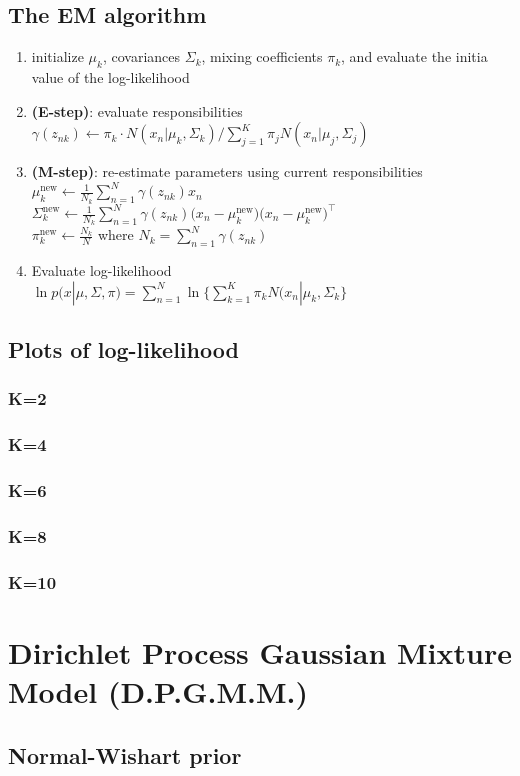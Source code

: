 \documentclass{article}
\begin{document}
\subsection{The EM algorithm}
\begin{enumerate}
	\item initialize $\mu_k$, covariances $\Sigma_k$, mixing coefficients $\pi_k$, and evaluate the initia value of the log-likelihood
	\item \textbf{(E-step)}: evaluate responsibilities\\
$\gamma(z_{nk}) \leftarrow \pi_k \cdot N(x_n | \mu_k, \Sigma_k) / \displaystyle \sum_{j=1}^K \pi_j N(x_n | \mu_j, \Sigma_j)$ \\
		\item \textbf{(M-step)}: re-estimate parameters using current responsibilities\\
	$\mu_k^{\text{new}} \leftarrow \frac{1}{N_k} \displaystyle \sum_{n=1}^N \gamma(z_{nk}) x_n$ \\
$\Sigma_k^{\text{new}} \leftarrow \frac{1}{N_k} \displaystyle \sum_{n=1}^N \gamma(z_{nk}) \Big(x_n - \mu_k^\text{new}\Big)\Big(x_n - \mu_k^\text{new}\Big)^\top$ \\
$ \pi_k^\text{new} \leftarrow \frac{N_k}{N}$ where $N_k = \displaystyle \sum_{n=1}^N \gamma(z_{nk})$

\item Evaluate log-likelihood \\
$\ln p(x | \mu, \Sigma, \pi) = \displaystyle \sum_{n=1}^N  \ln \Big\{ \sum_{k=1}^K \pi_k N(x_n | \mu_k, \Sigma_k \Big\} $

\end{enumerate}

\subsection{Plots of log-likelihood}
\subsubsection{K=2}
\subsubsection{K=4}
\subsubsection{K=6}
\subsubsection{K=8}
\subsubsection{K=10}

\newpage
\section{Dirichlet Process Gaussian Mixture Model (D.P.G.M.M.)}
\subsection{Normal-Wishart prior}
\end{document}
